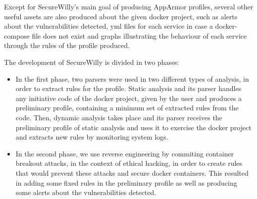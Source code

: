 Except for SecureWilly's main goal of producing AppArmor profiles, several other useful assets are also produced about the given docker project, such as alerts about the vulnerabilities detected, yml files for each service in case a docker-compose file does not exist and graphs illustrating the behaviour of each service through the rules of the profile produced.

The development of SecureWilly is divided in two phases:
\begin{itemize}
\item In the first phase, two parsers were used in two different types of analysis, in order to extract rules for the profile. Static analysis and its parser handles any initiative code of the docker project, given by the user and produces a preliminary profile, containing a minimum set of extracted rules from the code. Then, dynamic analysis takes place and its parser receives the preliminary profile of static analysis and uses it to exercise the docker project and extracts new rules by monitoring system logs.
\item In the second phase, we use reverse engineering by commiting container breakout attacks, in the context of ethical hacking, in order to create rules that would prevent these attacks and secure docker containers. This resulted in adding some fixed rules in the preliminary profile as well as producing some alerts about the vulnerabilities detected.
\end{itemize}


